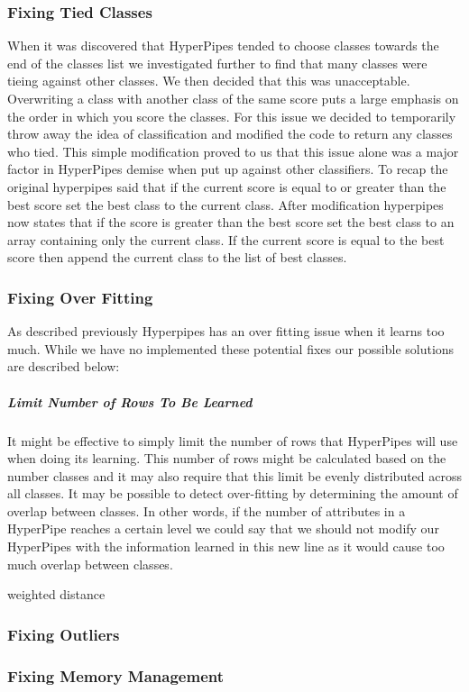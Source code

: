 \subsubsection{Fixing Tied Classes}
When it was discovered that HyperPipes tended to choose classes 
towards the end of the classes list we investigated further to 
find that many classes were tieing against other classes. We 
then decided that this was unacceptable. Overwriting a class 
with another class of the same score puts a large emphasis on 
the order in which you score the classes. For this issue we 
decided to temporarily throw away the idea of classification 
and modified the code to return any classes who tied. This 
simple modification proved to us that this issue alone was a 
major factor in HyperPipes demise when put up against other 
classifiers. To recap the original hyperpipes said that if 
the current score is equal to or greater than the best score 
set the best class to the current class. After modification 
hyperpipes now states that if the score is greater than the 
best score set the best class to an array containing only the 
current class. If the current score is equal to the best score 
then append the current class to the list of best classes.
\subsubsection{Fixing Over Fitting}
As described previously Hyperpipes has an over fitting issue 
when it learns too much. While we have no implemented these 
potential fixes our possible solutions are described below:

\subparagraph{Limit Number of Rows To Be Learned}
	It might be effective to simply limit the number of rows 
	that HyperPipes will use when doing its learning. This 
	number of rows might be calculated based on the number 
	classes and it may also require that this limit be 
	evenly distributed across all classes.
	It may be possible to detect over-fitting by determining 
	the amount of overlap between classes. In other words, 
	if the number of attributes in a HyperPipe reaches a 
	certain level we could say that we should not modify our 
	HyperPipes with the information learned in this new line
	as it would cause too much overlap between classes.
\item{weighted distance}
\subsubsection{Fixing Outliers}
\subsubsection{Fixing Memory Management}
